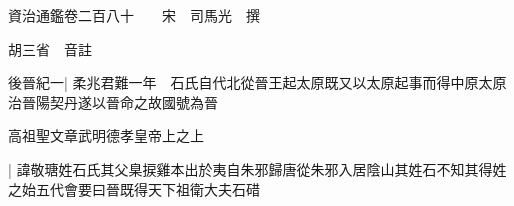 






























































資治通鑑卷二百八十　　宋　司馬光　撰

胡三省　音註

後晉紀一|{
	柔兆君難一年　石氏自代北從晉王起太原既又以太原起事而得中原太原治晉陽契丹遂以晉命之故國號為晉}


高祖聖文章武明德孝皇帝上之上

|{
	諱敬瑭姓石氏其父臬捩雞本出於夷自朱邪歸唐從朱邪入居陰山其姓石不知其得姓之始五代會要曰晉既得天下祖衛大夫石碏}


